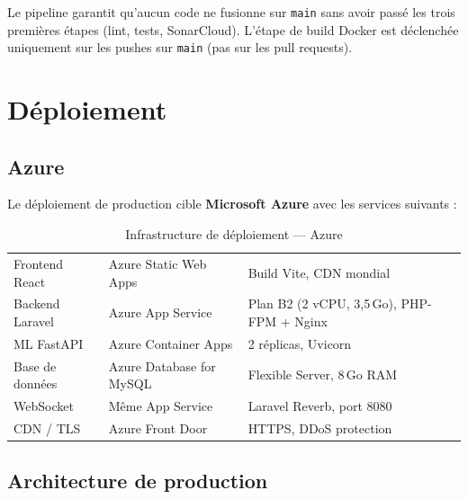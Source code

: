 Le pipeline garantit qu'aucun code ne fusionne sur \texttt{main} sans avoir
passé les trois premières étapes (lint, tests, SonarCloud). L'étape de build
Docker est déclenchée uniquement sur les pushes sur \texttt{main} (pas sur les
pull requests).

\section{Déploiement}

\subsection{Azure}

Le déploiement de production cible \textbf{Microsoft Azure} avec les services
suivants :

\begin{table}[H]
  \centering
  \caption{Infrastructure de déploiement — Azure}
  \label{tab:azure_infra}
  \begin{tabularx}{\textwidth}{L{4cm}L{4cm}X}
    \toprule
     &  &  \\
    \midrule
    Frontend React    & Azure Static Web Apps & Build Vite, CDN mondial \\
    Backend Laravel   & Azure App Service     & Plan B2 (2 vCPU, 3,5\,Go), PHP-FPM + Nginx \\
    ML FastAPI        & Azure Container Apps  & 2 réplicas, Uvicorn \\
    Base de données   & Azure Database for MySQL & Flexible Server, 8\,Go RAM \\
    WebSocket         & Même App Service      & Laravel Reverb, port 8080 \\
    CDN / TLS         & Azure Front Door      & HTTPS, DDoS protection \\
    \bottomrule
  \end{tabularx}
\end{table}

\subsection{Architecture de production}

